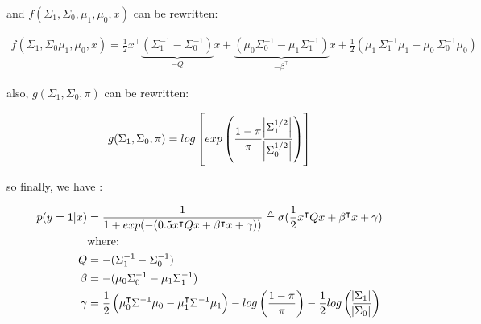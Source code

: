 \documentclass[11pt]{article}
\numberwithin{figure}{section} %
\begin{document}
and $f(\Sigma_1,\Sigma_0, \mu_1, \mu_0, x)$ can be rewritten:

\begin{align*}
f(\Sigma_1,\Sigma_0 \mu_1, \mu_0, x) = \frac{1}{2}x^{\intercal}\underbrace{(\Sigma_1^{-1}-\Sigma_0^{-1})}_{-Q}x
+ \underbrace{(\mu_0\Sigma_0^{-1} - \mu_1\Sigma_1^{-1})}_{-\beta^{\intercal}}x
+ \frac{1}{2}(\mu_1^{\intercal}\Sigma_1^{-1}\mu_1 - \mu_0^{\intercal}\Sigma_0^{-1}\mu_0)
\end{align*}

also, $g(\Sigma_1,\Sigma_0, \pi)$ can be rewritten:

\begin{align*}
g(\Sigma_1,\Sigma_0, \pi) = log\left[exp\left(\frac{1-\pi}{\pi}\frac{\abs{\Sigma_1^{1/2}}}{\abs{\Sigma_0^{1/2}}}\right)\right]
\end{align*}

so finally, we have :

\begin{tcolorbox}
\begin{align*}
p(y=1|x) & = \frac{1}{1 + exp(-( 0.5 x^{\intercal}Q x + \beta^{\intercal}x + \gamma))} \triangleq \sigma(\frac{1}{2}x^{\intercal}Q x + \beta^{\intercal}x + \gamma) \\
& \text{where: } \\ 
Q & = -(\Sigma_1^{-1}-\Sigma_0^{-1}) \\
\beta & = -(\mu_0\Sigma_0^{-1} - \mu_1\Sigma_1^{-1}) \\
\gamma & = \frac{1}{2}\left( \mu_0^{\intercal}\Sigma^{-1}\mu_0 - \mu_1^{\intercal}\Sigma^{-1}\mu_1 \right) - log\left(\frac{1-\pi}{\pi}\right) - \frac{1}{2}log\left(
\frac{\abs{\Sigma_1}}{\abs{\Sigma_0}}\right)
\end{align*}
\end{tcolorbox}
\end{document}
